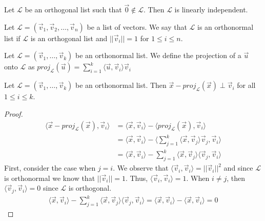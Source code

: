 \begin{theorem}
    Let $\mathcal{L}$ be an orthogonal list such that $\vec{0}\notin \mathcal{L}$. Then $\mathcal{L}$ is linearly independent.
\end{theorem}
\begin{definition}
    Let $\mathcal{L}=(\vec{v}_1,\vec{v}_2,\ldots,\vec{v}_n)$ be a list of vectors. We say that $\mathcal{L}$ is an orthonormal list if $\mathcal{L}$ is an orthogonal list and $||\vec{v}_i||=1$ for $1\leq i\leq n$.
\end{definition}
\begin{definition}
    Let $\mathcal{L}=(\vec{v}_1,\ldots,\vec{v}_k)$ be an orthonormal list. We define the projection of a $\vec{u}$ onto $\mathcal{L}$ as $proj_\mathcal{L}(\vec{u})=\sum_{i=1}^k\langle\vec{u},\vec{v}_i\rangle\vec{v}_i$
\end{definition}
\begin{theorem}
    Let $\mathcal{L}=(\vec{v}_1,\ldots,\vec{v}_k)$ be an orthonormal list. Then $\vec{x}-proj_\mathcal{L}(\vec{x})\perp \vec{v}_i$ for all $1\leq i\leq k$.
\end{theorem}
\begin{proof}
    \begin{align*}
        \langle \vec{x}-proj_\mathcal{L}(\vec{x}), \vec{v}_i\rangle&=\langle\vec{x},\vec{v}_i\rangle-\langle proj_\mathcal{L}(\vec{x}),\vec{v}_i\rangle\tag{by Linearity}\\
        &=\langle\vec{x},\vec{v}_i\rangle-\langle\sum_{j=1}^k\langle\vec{x},\vec{v}_j\rangle\vec{v}_j,\vec{v}_i\rangle\\
        &=\langle\vec{x},\vec{v}_i\rangle-\sum_{j=1}^k\langle\vec{x},\vec{v}_j\rangle\langle\vec{v}_j,\vec{v}_i\rangle\tag{by Linearity}
    \end{align*}
    First, consider the case when $j=i$. We observe that $\langle\vec{v}_i,\vec{v}_i\rangle=||\vec{v}_i||^2$ and since $\mathcal{L}$ is orthonormal we know that $||\vec{v}_i||=1$. Thus, $\langle\vec{v}_i,\vec{v}_i\rangle=1$. When $i\neq j$, then $\langle\vec{v}_j,\vec{v}_i\rangle=0$ since $\mathcal{L}$ is orthogonal.
    \begin{align*}
        \langle\vec{x},\vec{v}_i\rangle-\sum_{j=1}^k\langle\vec{x},\vec{v}_j\rangle\langle\vec{v}_j,\vec{v}_i\rangle=\langle\vec{x},\vec{v}_i\rangle-\langle\vec{x},\vec{v}_i\rangle=0
    \end{align*}
\end{proof}
